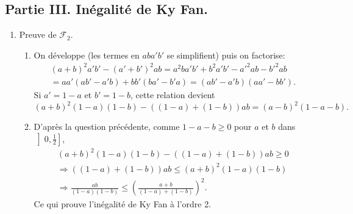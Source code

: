 \subsection*{Partie III. Inégalité de Ky Fan.}
\begin{enumerate}
 \item Preuve de $\mathcal{F}_2$.
\begin{enumerate}
 \item On développe (les termes en $aba'b'$ se simplifient) puis on factorise:
\begin{multline*}
 (a+b)^2a'b'-(a'+b')^2ab = a^2ba'b' + b^2a'b' -a'^2ab - b'^2ab \\
 = aa'(ab'-a'b) + bb'(ba'-b'a) 
 = (ab'-a'b)(aa'-bb').
\end{multline*}
Si $a'=1-a$ et $b'=1-b$, cette relation devient
\[
 (a+b)^2(1-a)(1-b) -((1-a)+(1-b))ab = (a-b)^2(1-a-b).
\]
 \item D'après la question précédente, comme $1-a-b \geq 0$ pour $a$ et $b$ dans $\left] 0, \frac{1}{2}\right]$, 
\begin{multline*}
  (a+b)^2(1-a)(1-b) -((1-a)+(1-b))ab \geq 0 \\
  \Rightarrow  ((1-a)+(1-b))ab \leq (a+b)^2(1-a)(1-b)\\
 \Rightarrow \frac{ab}{(1-a)(1-b)} \leq \left( \frac{a + b}{(1-a) + (1-b)}\right)^2. 
\end{multline*}
Ce qui prouve l'inégalité de Ky Fan à l'ordre 2.
\end{enumerate}


\end{enumerate}

